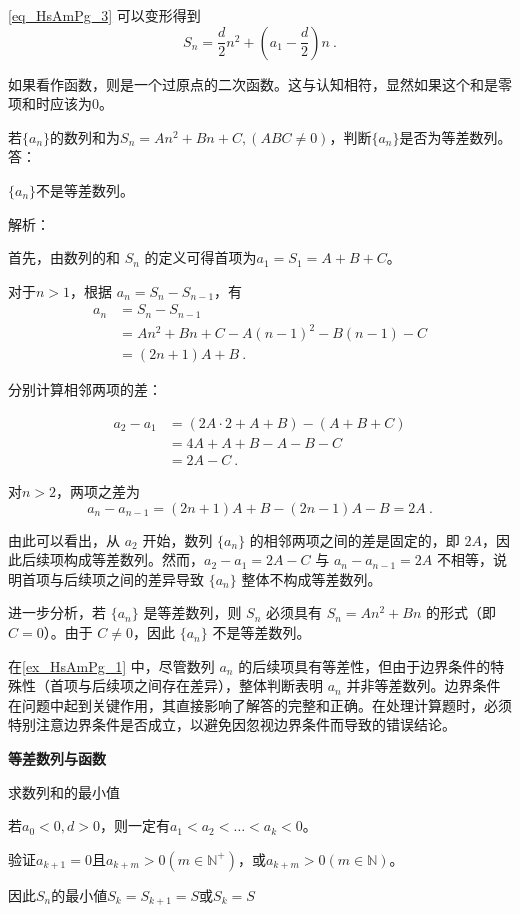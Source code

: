 \autoref{eq_HsAmPg_3} 可以变形得到
\begin{equation}
S_n = \frac{d}{2}n^2+\left(a_1-\frac{d}{2}\right)n~.
\end{equation}

如果看作函数，则是一个过原点的二次函数。这与认知相符，显然如果这个和是零项和时应该为$0$。


\begin{example}{若$\{a_n\}$的数列和为$S_n=An^2+Bn+C,(ABC\neq0)$，判断$\{a_n\}$是否为等差数列。}\label{ex_HsAmPg_1}
答：

$\{a_n\}$不是等差数列。

解析：

首先，由数列的和 $S_n$ 的定义可得首项为$a_1=S_1=A+B+C$。

对于$n>1$，根据 $a_n = S_n - S_{n-1}$，有
\begin{equation}
\begin{split}
a_n &= S_n-S_{n-1}\\
&=An^2+Bn+C-A(n-1)^2-B(n-1)-C\\
&=(2n+1)A+B~.
\end{split}
\end{equation}

分别计算相邻两项的差：

\begin{equation}
\begin{split}
a_2 - a_1 &= (2A \cdot 2 + A + B) - (A + B + C) \\
&= 4A + A + B - A - B - C \\
&= 2A - C~.
\end{split}
\end{equation}

对$n>2$，两项之差为
\begin{equation}
a_n-a_{n-1} = (2n+1)A+B-(2n-1)A-B=2A~.
\end{equation}

由此可以看出，从 $a_2$ 开始，数列 $\{a_n\}$ 的相邻两项之间的差是固定的，即 $2A$，因此后续项构成等差数列。然而，$a_2 - a_1 = 2A - C$ 与 $a_n - a_{n-1} = 2A$ 不相等，说明首项与后续项之间的差异导致 $\{a_n\}$ 整体不构成等差数列。

进一步分析，若 $\{a_n\}$ 是等差数列，则 $S_n$ 必须具有 $S_n = An^2 + Bn$ 的形式（即 $C = 0$）。由于 $C \neq 0$，因此 $\{a_n\}$ 不是等差数列。
\end{example}

在\autoref{ex_HsAmPg_1} 中，尽管数列 ${a_n}$ 的后续项具有等差性，但由于边界条件的特殊性（首项与后续项之间存在差异），整体判断表明 ${a_n}$ 并非等差数列。边界条件在问题中起到关键作用，其直接影响了解答的完整和正确。在处理计算题时，必须特别注意边界条件是否成立，以避免因忽视边界条件而导致的错误结论。

\textbf{等差数列与函数}

求数列和的最小值

若$a_0<0,d>0$，则一定有$a_1<a_2<\dots<a_{k}<0$。

验证$a_{k+1} =0$且$a_{k+m}>0(m\in\mathbb{N}^+)$，或$a_{k+m}>0(m\in\mathbb{N})$。

因此$S_n$的最小値$S_k=S_{k+1}=S$或$S_k=S$
